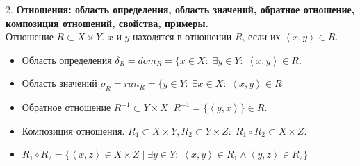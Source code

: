 \documentclass[12pt]{article}
\begin{document}
2. \textbf{Отношения: область определения, область значений, обратное отношение, композиция отношений, свойства, примеры.}\\
Отношение $R \subset X \times Y$. $x$ и $y$ находятся в отношении $R$, если их $\left<x, y\right> \in R$.
\begin{itemize}
    \item Область определения $\delta_R = {dom}_R = \{x \in X: \; \exists y \in Y: \; \left<x, y\right> \in R$.
    \item Область значений $\rho_R = {ran}_R = \{y \in Y: \; \exists x \in X: \; \left<x, y\right> \in R$
    \item Обратное отношение $R^{-1} \subset Y \times X \; \; R^{-1} = \{\left<y,x\right>\} \in R$.
    \item Композиция отношения. $R_1 \subset X \times Y, R_2 \subset Y \times Z: \; R_1 \circ R_2 \subset X \times Z$.
    \item $R_1 \circ R_2 = \{\left<x, z\right> \in X \times Z\; \vert \; \exists y \in Y: \; \left<x,y\right> \in R_1 \land \left<y,z\right> \in R_2\}$
\end{itemize}
\end{document}
